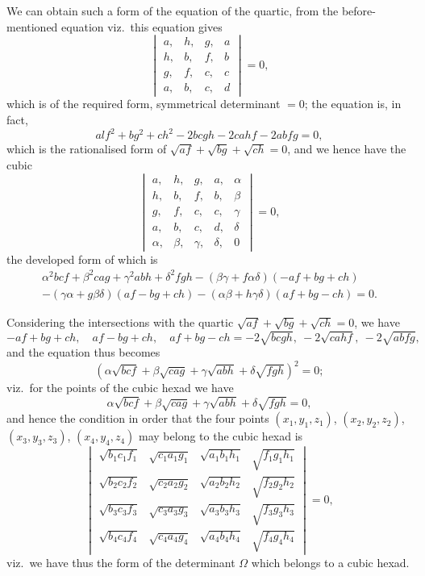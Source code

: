 \documentclass[11pt,a4paper]{book}
\begin{document}
We can obtain such a form of the equation of the quartic, from the before-mentioned equation viz.\ this equation gives
\[
\begin{vmatrix}
a, & h, & g, & a \\
h, & b, & f, & b \\
g, & f, & c, & c \\
a, & b, & c, & d
\end{vmatrix}
= 0,
\]
which is of the required form, symmetrical determinant $= 0$; the equation is, in fact,
\[
alf^2 + bg^2 + ch^2 - 2bcgh - 2cahf - 2abfg = 0,
\]
which is the rationalised form of $\sqrt{af} + \sqrt{bg} + \sqrt{ch} = 0$, and we hence have the cubic
\[
\begin{vmatrix}
a, & h, & g, & a, & \alpha \\
h, & b, & f, & b, & \beta \\
g, & f, & c, & c, & \gamma \\
a, & b, & c, & d, & \delta \\
\alpha, & \beta, & \gamma, & \delta, & 0
\end{vmatrix}
= 0,
\]
the developed form of which is
\begin{multline*}
\alpha^2bcf + \beta^2cag + \gamma^2abh + \delta^2fgh - (\beta\gamma + f\alpha\delta)(-af + bg + ch) \\
- (\gamma\alpha + g\beta\delta)(af - bg + ch) - (\alpha\beta + h\gamma\delta)(af + bg - ch) = 0.
\end{multline*}

Considering the intersections with the quartic $\sqrt{af} + \sqrt{bg} + \sqrt{ch} = 0$, we have
\[
-af + bg + ch, \quad af - bg + ch, \quad af + bg - ch = -2\sqrt{bcgh}, \ -2\sqrt{cahf}, \ -2\sqrt{abfg},
\]
and the equation thus becomes
\[
(\alpha\sqrt{bcf} + \beta\sqrt{cag} + \gamma\sqrt{abh} + \delta\sqrt{fgh})^2 = 0;
\]
viz.\ for the points of the cubic hexad we have
\[
\alpha\sqrt{bcf} + \beta\sqrt{cag} + \gamma\sqrt{abh} + \delta\sqrt{fgh} = 0,
\]
and hence the condition in order that the four points $(x_1, y_1, z_1)$, $(x_2, y_2, z_2)$, $(x_3, y_3, z_3)$, $(x_4, y_4, z_4)$ may belong to the cubic hexad is
\[
\begin{vmatrix}
\sqrt{b_1c_1f_1} & \sqrt{c_1a_1g_1} & \sqrt{a_1b_1h_1} & \sqrt{f_1g_1h_1} \\
\sqrt{b_2c_2f_2} & \sqrt{c_2a_2g_2} & \sqrt{a_2b_2h_2} & \sqrt{f_2g_2h_2} \\
\sqrt{b_3c_3f_3} & \sqrt{c_3a_3g_3} & \sqrt{a_3b_3h_3} & \sqrt{f_3g_3h_3} \\
\sqrt{b_4c_4f_4} & \sqrt{c_4a_4g_4} & \sqrt{a_4b_4h_4} & \sqrt{f_4g_4h_4}
\end{vmatrix}
= 0,
\]
viz.\ we have thus the form of the determinant $\Omega$ which belongs to a cubic hexad.
\end{document}
